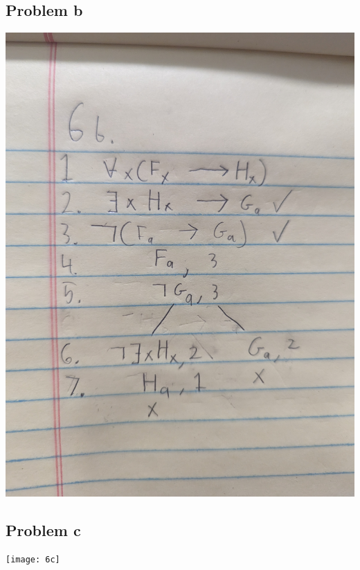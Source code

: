 \documentclass[12pt]{article}
\begin{document}
\subsection*{Problem b}
\includegraphics[width=\textwidth]{6b}

\subsection*{Problem c}
\texttt{[image: 6c]}
\end{document}
